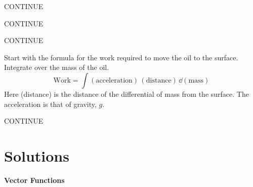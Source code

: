\begin{Hint}
  \label{hint volume R rotate y}
  CONTINUE  
\end{Hint}






\begin{Hint}
  \label{hint cylinder intersect}
  CONTINUE  
\end{Hint}








\begin{Hint}
  \label{hint length area volume 1/x}
  CONTINUE  
\end{Hint}





\begin{Hint}
  \label{hint oil work}
  Start with the formula for the work required to move the oil to 
  the surface.  Integrate over the mass of the oil.
  \[
  \mathrm{Work} = \int (\mathrm{acceleration})\,(\mathrm{distance})\,\dd (\mathrm{mass})
  \]
  Here (distance) is the distance of the differential of mass from the 
  surface.  The acceleration is that of gravity, $g$.
\end{Hint}





\begin{Hint}
  \label{hint area volume sphere}
  CONTINUE  
\end{Hint}







\raggedbottom
\pagebreak
\flushbottom
\section{Solutions}






\begin{large}
  \noindent
  \textbf{Vector Functions}
\end{large}



